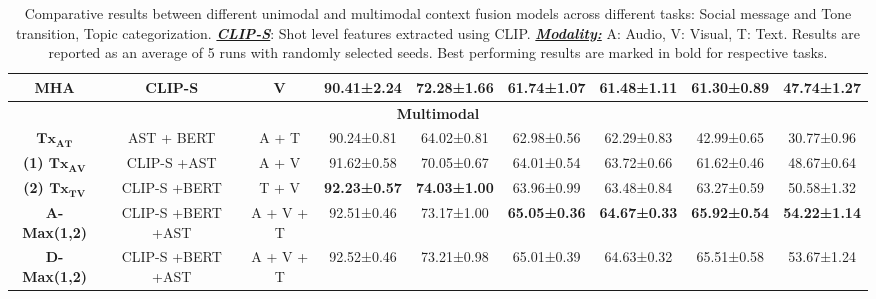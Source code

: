 \begin{table}[h!]
{\begin{tabular}{|ccccccccc|}
\multicolumn{1}{|c|}{\textbf{MHA}}        & \multicolumn{1}{c|}{CLIP-S}            & \multicolumn{1}{c|}{V}                 & \multicolumn{1}{c|}{90.41±2.24}   & \multicolumn{1}{c|}{72.28±1.66}  & \multicolumn{1}{c|}{61.74±1.07}   & \multicolumn{1}{c|}{61.48±1.11}  & \multicolumn{1}{c|}{61.30±0.89}     & 47.74±1.27   \\ \hline
\multicolumn{9}{|c|}{\textbf{Multimodal}}                                                                                                                                                                                                                                                                                      \\ \hline
\multicolumn{1}{|c|}{$\mathbf{Tx_{AT}}$}      & \multicolumn{1}{c|}{AST + BERT}        & \multicolumn{1}{c|}{A + T}             & \multicolumn{1}{c|}{90.24±0.81}   & \multicolumn{1}{c|}{64.02±0.81}  & \multicolumn{1}{c|}{62.98±0.56}   & \multicolumn{1}{c|}{62.29±0.83}  & \multicolumn{1}{c|}{42.99±0.65}     & 30.77±0.96   \\ \hline
\multicolumn{1}{|c|}{\textbf{(1) $\mathbf{Tx_{AV}}$}}  & \multicolumn{1}{c|}{CLIP-S +AST}       & \multicolumn{1}{c|}{A + V}             & \multicolumn{1}{c|}{91.62±0.58}   & \multicolumn{1}{c|}{70.05±0.67}  & \multicolumn{1}{c|}{64.01±0.54}   & \multicolumn{1}{c|}{63.72±0.66}  & \multicolumn{1}{c|}{61.62±0.46}     & 48.67±0.64   \\ \hline
\multicolumn{1}{|c|}{\textbf{(2) $\mathbf{Tx_{TV}}$}}  & \multicolumn{1}{c|}{CLIP-S +BERT}      & \multicolumn{1}{c|}{T + V}             & \multicolumn{1}{c|}{\textbf{92.23±0.57}}  & \multicolumn{1}{c|}{\textbf{74.03±1.00}}  & \multicolumn{1}{c|}{63.96±0.99}   & \multicolumn{1}{c|}{63.48±0.84}  & \multicolumn{1}{c|}{63.27±0.59}     & 50.58±1.32   \\ \hline
\multicolumn{1}{|c|}{\textbf{A-Max(1,2)}} & \multicolumn{1}{c|}{CLIP-S +BERT +AST} & \multicolumn{1}{c|}{A + V + T}          & \multicolumn{1}{c|}{92.51±0.46}   & \multicolumn{1}{c|}{73.17±1.00}  & \multicolumn{1}{c|}{\textbf{65.05±0.36}}   & \multicolumn{1}{c|}{\textbf{64.67±0.33}} & \multicolumn{1}{c|}{\textbf{65.92±0.54}}     & \textbf{54.22±1.14}  \\ \hline
\multicolumn{1}{|c|}{\textbf{D-Max(1,2)}} & \multicolumn{1}{c|}{CLIP-S +BERT +AST} & \multicolumn{1}{c|}{A + V + T}          & \multicolumn{1}{c|}{92.52±0.46}   & \multicolumn{1}{c|}{73.21±0.98}  & \multicolumn{1}{c|}{65.01±0.39}   & \multicolumn{1}{c|}{64.63±0.32}  & \multicolumn{1}{c|}{65.51±0.58}     & 53.67±1.24   \\ \hline
\end{tabular}
}
\caption{Comparative results between different unimodal and multimodal context fusion models across different tasks: Social message and Tone transition, Topic categorization. \textbf{\textit{\underline{CLIP-S}}}: Shot level features extracted using CLIP. \textbf{\textit{\underline{Modality:}}} A: Audio, V: Visual, T: Text. Results are reported as an average of 5 runs with randomly selected seeds. Best performing results are marked in bold for respective tasks.}  
\label{exptable}
\end{table}

